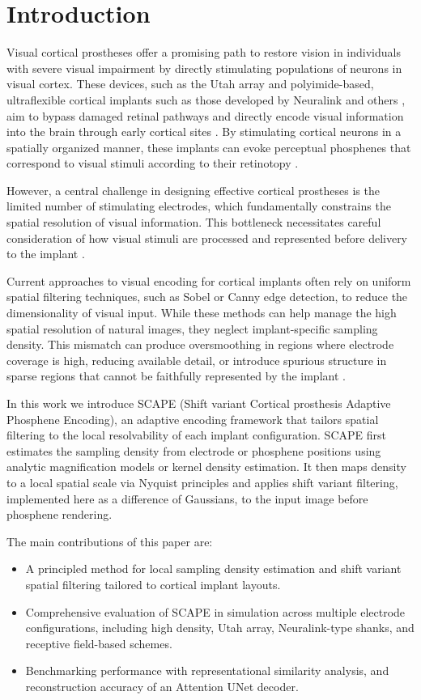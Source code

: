 \section{Introduction}
Visual cortical prostheses offer a promising path to restore vision in individuals with severe visual impairment by directly stimulating populations of neurons in visual cortex. These devices, such as the Utah array \cite{Maynard1997, Normann1999,Schmidt1996} and polyimide-based, ultraflexible cortical implants such as those developed by Neuralink and others \cite{Musk2019,Zhao2023,Orlemann2024}, aim to bypass damaged retinal pathways and directly encode visual information into the brain through early cortical sites \cite{Fernandez2021}. By stimulating cortical neurons in a spatially organized manner, these implants can evoke perceptual phosphenes that correspond to visual stimuli according to their retinotopy \cite{Chen2020}.

However, a central challenge in designing effective cortical prostheses is the limited number of stimulating electrodes, which fundamentally constrains the spatial resolution of visual information. This bottleneck necessitates careful consideration of how visual stimuli are processed and represented before delivery to the implant \cite{Lozano2020,vanderGrinten2024,Beyeler2022,vanSteveninck2022}.

Current approaches to visual encoding for cortical implants often rely on uniform spatial filtering techniques, such as Sobel or Canny edge detection, to reduce the dimensionality of visual input. While these methods can help manage the high spatial resolution of natural images, they neglect implant-specific sampling density. This mismatch can produce oversmoothing in regions where electrode coverage is high, reducing available detail, or introduce spurious structure in sparse regions that cannot be faithfully represented by the implant \cite{Kasowski2022,Han2021,Relic2022}.

In this work we introduce SCAPE (Shift variant Cortical prosthesis Adaptive Phosphene Encoding), an adaptive encoding framework that tailors spatial filtering to the local resolvability of each implant configuration. SCAPE first estimates the sampling density from electrode or phosphene positions using analytic magnification models or kernel density estimation. It then maps density to a local spatial scale via Nyquist principles and applies shift variant filtering, implemented here as a difference of Gaussians, to the input image before phosphene rendering.

The main contributions of this paper are:
\begin{itemize}
  \item A principled method for local sampling density estimation and shift variant spatial filtering tailored to cortical implant layouts.
  \item Comprehensive evaluation of SCAPE in simulation across multiple electrode configurations, including high density, Utah array, Neuralink-type shanks, and receptive field-based schemes.
  \item Benchmarking performance with representational similarity analysis, and reconstruction accuracy of an Attention UNet decoder.
\end{itemize}
